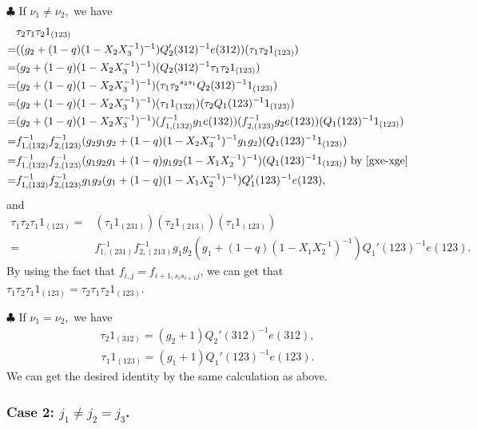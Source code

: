 \documentclass[11pt, reqno]{amsart} \textwidth=14.9cm \oddsidemargin=1cm \evensidemargin=1cm
\theoremstyle{definition}
\numberwithin{equation}{section}
\begin{document}
$\clubsuit$ If $\nu_1\neq \nu_2,$ we have
\begin{align*}
&\tau_{2}\tau_{1}\tau_{2}1_{(123)}\\
=&((g_{2}+(1-q)(1-X_{2}X_{3}^{-1})^{-1})Q_{2}'(312)^{-1}e(312))(\tau_{1}\tau_{2}1_{(123)})\\
=&(g_{2}+(1-q)(1-X_{2}X_{3}^{-1})^{-1})(Q_{2}(312)^{-1}\tau_{1}\tau_{2}1_{(123)})\\
=&(g_{2}+(1-q)(1-X_{2}X_{3}^{-1})^{-1})(\tau_{1}\tau_{2}{}^{s_{2}s_{1}}Q_{2}(312)^{-1}1_{(123)})\\
=&(g_{2}+(1-q)(1-X_{2}X_{3}^{-1})^{-1})(\tau_{1}1_{(132)})(\tau_{2}Q_{1}(123)^{-1}1_{(123)})\\
=&(g_{2}+(1-q)(1-X_{2}X_{3}^{-1})^{-1})(f_{1, (132)}^{-1}g_{1}e(132))(f_{2, (123)}^{-1}g_{2}e(123))(Q_{1}(123)^{-1}1_{(123)})\\
=&f_{1, (132)}^{-1}f_{2, (123)}^{-1}(g_{2}g_{1}g_{2}+(1-q)(1-X_{2}X_{3}^{-1})^{-1}g_{1}g_{2})(Q_{1}(123)^{-1}1_{(123)})\\
=&f_{1, (132)}^{-1}f_{2, (123)}^{-1}(g_{1}g_{2}g_{1}+(1-q)g_{1}g_{2}(1-X_{1}X_{2}^{-1})^{-1})(Q_{1}(123)^{-1}1_{(123)})\text{ by }\eqref{gxe-xge}\\
=&f_{1, (132)}^{-1}f_{2, (123)}^{-1}g_{1}g_{2}(g_{1}+(1-q)(1-X_{1}X_{2}^{-1})^{-1})Q_{1}'(123)^{-1}e(123),
\end{align*}
and
\begin{align*}
\tau_{1}\tau_{2}\tau_{1}1_{(123)}=&(\tau_{1}1_{(231)})(\tau_{2}1_{(213)})(\tau_{1}1_{(123)})\\
=&f_{1, (231)}^{-1}f_{2, (213)}^{-1}g_{1}g_{2}(g_{1}+(1-q)(1-X_{1}X_{2}^{-1})^{-1})Q_{1}'(123)^{-1}e(123).
\end{align*}
By using the fact that $f_{i, j}=f_{i+1, s_{i}s_{i+1}j}$, we can get that $\tau_{1}\tau_{2}\tau_{1}1_{(123)}=\tau_{2}\tau_{1}\tau_{2}1_{(123)}$.

$\clubsuit$ If $\nu_1=\nu_2,$ we have
\begin{align*}
\tau_{2}1_{(312)}=(g_{2}+1)Q_{2}'(312)^{-1}e(312),
\end{align*}
\begin{align*}
\tau_{1}1_{(123)}=(g_{1}+1)Q_{1}'(123)^{-1}e(123).
\end{align*}
We can get the desired identity by the same calculation as above.
\subsubsection*{Case 2: $j_1\neq j_2=j_3$.}

\
\end{document}
